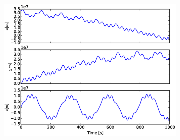 \documentclass[x11names]{article}
\renewcommand{\va}{\vec}
\begin{document}
    \begin{figure}
      \begin{subfigure}{0.45\textwidth}
        \includegraphics[width = \textwidth]{../source/Figures/xyzVerlet}
      \end{subfigure}
    \end{figure}
\end{document}

